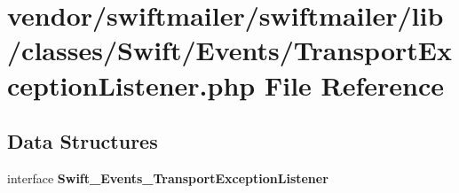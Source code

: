 \section{vendor/swiftmailer/swiftmailer/lib/classes/\+Swift/\+Events/\+Transport\+Exception\+Listener.php File Reference}
\label{_transport_exception_listener_8php}
\subsection*{Data Structures}
\begin{DoxyCompactItemize}
\item 
interface {\bf Swift\+\_\+\+Events\+\_\+\+Transport\+Exception\+Listener}
\end{DoxyCompactItemize}
